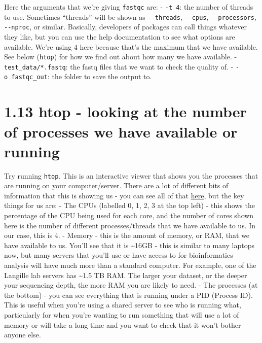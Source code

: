 \documentclass[
]{book}
\begin{document}
Here the arguments that we're giving \texttt{fastqc} are:
- \texttt{-t\ 4}: the number of threads to use. Sometimes ``threads'' will be shown as \texttt{-\/-threads}, \texttt{-\/-cpus}, \texttt{-\/-processors}, \texttt{-\/-nproc}, or similar. Basically, developers of packages can call things whatever they like, but you can use the help documentation to see what options are available. We're using 4 here because that's the maximum that we have available. See below (\texttt{htop}) for how we find out about how many we have available.
- \texttt{test\_data/*.fastq}: the fastq files that we want to check the quality of.
- \texttt{-o\ fastqc\_out}: the folder to save the output to.

\section{1.13 htop - looking at the number of processes we have available or running}\label{htop---looking-at-the-number-of-processes-we-have-available-or-running}

Try running \texttt{htop}. This is an interactive viewer that shows you the processes that are running on your computer/server. There are a lot of different bits of information that this is showing us - you can see all of that \href{https://monovm.com/blog/what-is-htop-and-what-does-it-do/\#:~:text=Htop\%20is\%20an\%20interactive\%20system,system\%20processes\%20can\%20be\%20viewed.}{here}, but the key things for us are:
- The CPUs (labelled 0, 1, 2, 3 at the top left) - this shows the percentage of the CPU being used for each core, and the number of cores shown here is the number of different processes/threads that we have available to us. In our case, this is 4.
- Memory - this is the amount of memory, or RAM, that we have available to us. You'll see that it is \textasciitilde16GB - this is similar to many laptops now, but many servers that you'll use or have access to for bioinformatics analysis will have much more than a standard computer. For example, one of the Langille lab servers has \textasciitilde1.5 TB RAM. The larger your dataset, or the deeper your sequencing depth, the more RAM you are likely to need.
- The processes (at the bottom) - you can see everything that is running under a PID (Process ID). This is useful when you're using a shared server to see who is running what, particularly for when you're wanting to run something that will use a lot of memory or will take a long time and you want to check that it won't bother anyone else.
\end{document}
